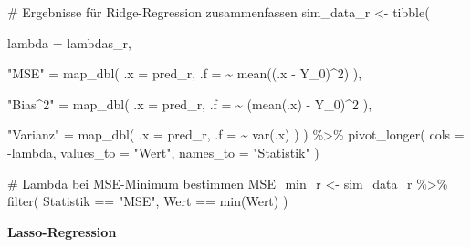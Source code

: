 \documentclass[
  a4paper,
  DIV=11,
  oneside]{scrreprt}
\newenvironment{Shaded}{\begin{snugshade}}{\end{snugshade}}
\newcommand{\AttributeTok}[1]{\textcolor[rgb]{0.40,0.45,0.13}{#1}}
\newcommand{\CommentTok}[1]{\textcolor[rgb]{0.37,0.37,0.37}{#1}}
\newcommand{\DecValTok}[1]{\textcolor[rgb]{0.68,0.00,0.00}{#1}}
\newcommand{\FunctionTok}[1]{\textcolor[rgb]{0.28,0.35,0.67}{#1}}
\newcommand{\NormalTok}[1]{\textcolor[rgb]{0.00,0.23,0.31}{#1}}
\newcommand{\OtherTok}[1]{\textcolor[rgb]{0.00,0.23,0.31}{#1}}
\newcommand{\SpecialCharTok}[1]{\textcolor[rgb]{0.37,0.37,0.37}{#1}}
\newcommand{\StringTok}[1]{\textcolor[rgb]{0.13,0.47,0.30}{#1}}
\begin{document}
\begin{Shaded}
\begin{Highlighting}[]
\CommentTok{\# Ergebnisse für Ridge{-}Regression zusammenfassen}
\NormalTok{sim\_data\_r }\OtherTok{\textless{}{-}} \FunctionTok{tibble}\NormalTok{(}
  
  \AttributeTok{lambda =}\NormalTok{ lambdas\_r,}
  
  \StringTok{"MSE"} \OtherTok{=} \FunctionTok{map\_dbl}\NormalTok{(}
    \AttributeTok{.x =}\NormalTok{ pred\_r,  }
    \AttributeTok{.f =} \SpecialCharTok{\textasciitilde{}} \FunctionTok{mean}\NormalTok{((.x }\SpecialCharTok{{-}}\NormalTok{ Y\_0)}\SpecialCharTok{\^{}}\DecValTok{2}\NormalTok{)}
\NormalTok{  ),}
  
  \StringTok{"Bias\^{}2"} \OtherTok{=} \FunctionTok{map\_dbl}\NormalTok{(}
    \AttributeTok{.x =}\NormalTok{ pred\_r, }
    \AttributeTok{.f =} \SpecialCharTok{\textasciitilde{}}\NormalTok{ (}\FunctionTok{mean}\NormalTok{(.x) }\SpecialCharTok{{-}}\NormalTok{ Y\_0)}\SpecialCharTok{\^{}}\DecValTok{2}
\NormalTok{  ),}
  
  \StringTok{"Varianz"} \OtherTok{=} \FunctionTok{map\_dbl}\NormalTok{(}
    \AttributeTok{.x =}\NormalTok{ pred\_r, }
    \AttributeTok{.f =} \SpecialCharTok{\textasciitilde{}} \FunctionTok{var}\NormalTok{(.x)}
\NormalTok{  )}
\NormalTok{) }\SpecialCharTok{\%\textgreater{}\%}
  \FunctionTok{pivot\_longer}\NormalTok{(}
    \AttributeTok{cols =} \SpecialCharTok{{-}}\NormalTok{lambda, }
    \AttributeTok{values\_to =} \StringTok{"Wert"}\NormalTok{,}
    \AttributeTok{names\_to =} \StringTok{"Statistik"}
\NormalTok{  )}

\CommentTok{\# Lambda bei MSE{-}Minimum bestimmen}
\NormalTok{MSE\_min\_r }\OtherTok{\textless{}{-}}\NormalTok{ sim\_data\_r }\SpecialCharTok{\%\textgreater{}\%} 
  \FunctionTok{filter}\NormalTok{(}
\NormalTok{    Statistik }\SpecialCharTok{==} \StringTok{"MSE"}\NormalTok{,}
\NormalTok{    Wert }\SpecialCharTok{==} \FunctionTok{min}\NormalTok{(Wert)}
\NormalTok{  ) }
\end{Highlighting}
\end{Shaded}

\textbf{Lasso-Regression}
\end{document}
